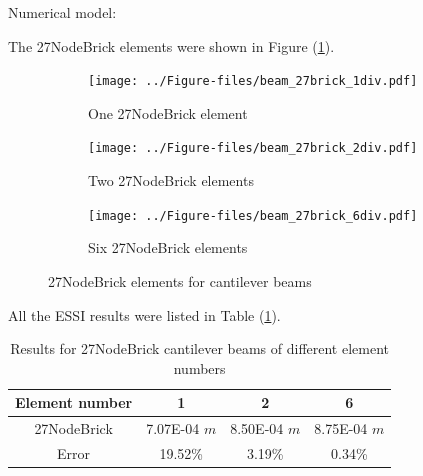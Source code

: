\documentclass[fleqn,11pt]{article}
\begin{document}
Numerical model:

The 27NodeBrick elements were shown in Figure (\ref{fig 27NodeBrick elements for cantilever beams}).

\begin{figure}[H]
  \centering
  \begin{subfigure}{0.5\textwidth}
    \centering
    \texttt{[image: ../Figure-files/beam\_27brick\_1div.pdf]}
    \caption{One 27NodeBrick element}
  \end{subfigure}
  \vskip 8pt
  \begin{subfigure}{0.5\textwidth}
    \centering
    \texttt{[image: ../Figure-files/beam\_27brick\_2div.pdf]}
    \caption{Two 27NodeBrick elements}
  \end{subfigure}
  \vskip 8pt
  \begin{subfigure}{0.5\textwidth}
    \centering
    \texttt{[image: ../Figure-files/beam\_27brick\_6div.pdf]}
    \caption{Six 27NodeBrick elements}
  \end{subfigure}
  \captionsetup{justification=centering,margin=3cm}
  \caption{27NodeBrick elements for cantilever beams}
  \label{fig 27NodeBrick elements for cantilever beams}
\end{figure}










All the ESSI results were listed in Table (\ref{table 27NodeBrick cantilever beams results for different element number}). 
\begin{table}[H]
  \centering
      \caption{Results for 27NodeBrick cantilever beams of different element numbers}
    \label{table 27NodeBrick cantilever beams results for different element number}
    \begin{tabular}{|c|c|c|c|}
      \hline
      Element number & 1        & 2        & 6         \\  \hline
      27NodeBrick     & 7.07E-04 $m$ & 8.50E-04 $m$ & 8.75E-04 $m$     \\ \hline
      Error           & 19.52\% & 3.19\% & 0.34\%    \\ 
      \hline 
    \end{tabular}
\end{table}
\end{document}
